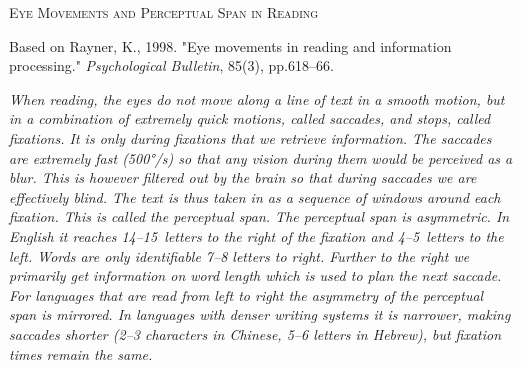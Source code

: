 \documentclass{article}
\def\fixcolor{blue!30!gray}
\def\saccolor{red!50!gray}
\begin{document}
\centerline{\Huge 
\scshape Eye Movements and Perceptual Span in Reading
}

\bigskip
\centerline{Based on Rayner, K., 1998. "Eye movements in reading and information processing."  \textit{Psychological Bulletin}, 85(3), pp.618--66.}

\bigskip



\begin{multicols}{3}
  \setlength\parfillskip{0pt}
  \setlength\emergencystretch{40pt}
\itshape
When reading, the eyes do not move along a line of text in a smooth motion, but in a combination of extremely quick motions, called \textcolor{\saccolor}{\mbox{saccades}}, and stops, called \textcolor{\fixcolor}{\mbox{fixations}}. It is only during fixations that we retrieve information. The saccades are extremely fast (500°/s) so that any vision during them would be perceived as a blur. This is however filtered out by the brain so that during saccades we are effectively blind. The text is thus taken in as a sequence of windows around each fixation. This is called the perceptual span. The perceptual span is asymmetric. In English it reaches 14--15~letters to the right of the fixation and 4--5~letters to the left. Words are only identifiable 7--8 letters to right. Further to the right we primarily get information on word length which is used to plan the next saccade. For languages that are read from left to right the asymmetry of the perceptual span is mirrored. In languages with denser writing systems it is narrower, making saccades shorter (2--3 characters in Chinese, 5--6 letters in Hebrew), but fixation times remain the same. 
\end{multicols}


\vspace{3.5cm}
\end{document}
